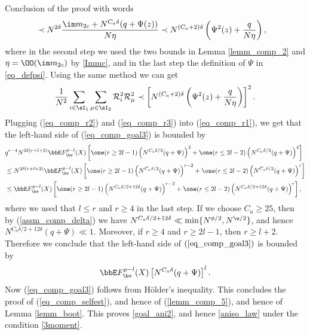 \begin{subsection}{Conclusion of the proof with words}
\begin{align}
& \prec N^{2\delta}\frac{\im m_{2c} + N^{C_a\delta}(q+\Psi(z)) }{N\eta}\prec N^{(C_a+2)\delta} \left( \Psi^2(z) + \frac{q}{N\eta}\right), \label{eq_comp_r2}
\end{align}
where in the second step we used the two bounds in Lemma \ref{lemm_comp_2} and $\eta =\OO(\im m_{2c})$ by \eqref{Immc}, and in the last step the definition of $\Psi$ in \eqref{eq_defpsi}. Using the same method we can get
\begin{equation}\label{eq_comp_r3}
\frac{1}{N^2}\sum_{i\in\sI_1}\sum_{\mu\in\sI_2}\mathcal R_i^2\mathcal R_\mu^2\prec \left[N^{(C_a+2)\delta}\left(\Psi^2(z) + \frac{q}{N\eta}\right)\right]^2.
\end{equation}
Plugging (\ref{eq_comp_r2}) and (\ref{eq_comp_r3}) into (\ref{eq_comp_r1}), we get that the left-hand side of
(\ref{eq_comp_goal3}) is bounded by
\begin{align*}
& q^{r-4}N^{2\delta(r+l+2)}\bbE F_{\bv}^{p-l}(X)\left[\one(r\ge 2l-1)\left(N^{C_a\delta/2}(q+\Psi)\right)^2+\one(r\le 2l-2)\left(N^{C_a\delta/2}(q+\Psi)\right)^4\right]\\
& \le N^{2\delta(r+l+2)} \bbE F_{\bv}^{p-l}(X)\left[\one(r\ge 2l-1)\left(N^{C_a\delta/2}(q+\Psi)\right)^{r-2}+\one(r\le 2l-2)\left(N^{C_a\delta/2}(q+\Psi)\right)^r\right]\\
 &\le \bbE F_{\bv}^{p-l}(X)\left[\one(r\ge 2l-1)\left(N^{C_a\delta/2+12\delta}(q+\Psi)\right)^{r-2}+\one(r\le 2l-2)\left(N^{C_a\delta/2+12\delta}(q+\Psi)\right)^r\right],
\end{align*}
where we used that $l\le r$ and $r\ge 4$ in the last step. If we choose $C_a\ge 25$, then by (\ref{assm_comp_delta}) we have $N^{C_a\delta/2+12\delta} \ll \min \{ N^{\phi/2},N^{\e/2}\}$, and hence $N^{C_a\delta/2+12\delta}(q+\Psi) \ll 1$. Moreover, if $r\ge 4$ and $r\ge 2l-1$, then $r\ge l+2$. Therefore we conclude that the left-hand side of $(\ref{eq_comp_goal3})$ is bounded by
\begin{equation}
\bbE F_{\bv}^{p-l}(X)\left[N^{C_a\delta}(q+\Psi)\right]^l.
\end{equation}
Now (\ref{eq_comp_goal3}) follows from H\"older's inequality. This concludes the proof of (\ref{eq_comp_selfest}), and hence of (\ref{lemm_comp_5}), and hence of Lemma \ref{lemm_boot}. This proves \eqref{goal_ani2}, and hence \eqref{aniso_law} under the condition \eqref{3moment}.



\end{subsection}
